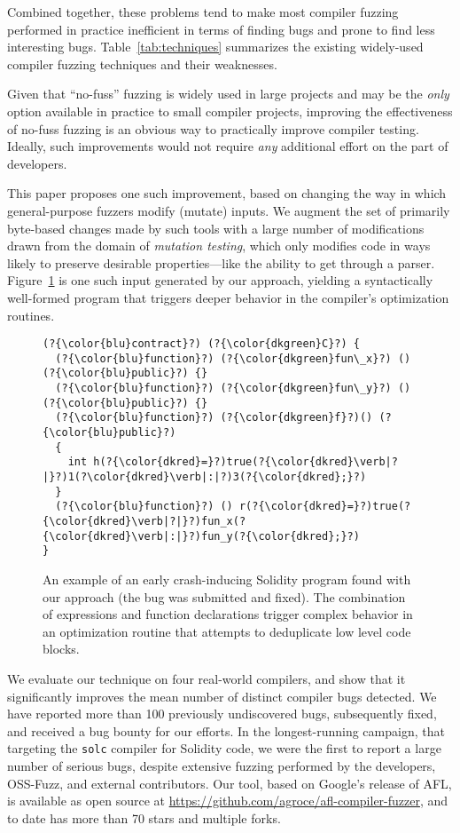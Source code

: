   Combined together, these problems tend to make most compiler fuzzing
  performed in practice inefficient in
  terms of finding bugs and prone to find less interesting bugs.
  Table~\ref{tab:techniques} summarizes the existing widely-used
  compiler fuzzing techniques and their weaknesses.

  Given that ``no-fuss'' fuzzing is widely used in large projects and
  may be the \emph{only} option available in
  practice to small compiler projects, improving the effectiveness of no-fuss fuzzing is an obvious way to practically improve compiler
  testing.  Ideally, such improvements would not require \emph{any}
  additional effort on the part of developers.

  This paper proposes one such improvement, based on changing the way
  in which general-purpose fuzzers modify (mutate) inputs.  We augment
  the set of primarily byte-based changes made by such tools with a large number of
  modifications drawn from the domain of \emph{mutation testing},
  which only modifies code in ways likely to preserve desirable
  properties---like the ability to get through a parser. Figure~\ref{lst:sol-exemplar}
  is one such input generated by our approach, yielding a syntactically well-formed program that
  triggers deeper behavior in the compiler's optimization routines.

\begin{figure}[h!]
\begin{lstlisting}[basicstyle=\scriptsize\ttfamily,numbers=none,xleftmargin=0.7em,xrightmargin=.7em]
(?{\color{blu}contract}?) (?{\color{dkgreen}C}?) {
  (?{\color{blu}function}?) (?{\color{dkgreen}fun\_x}?) () (?{\color{blu}public}?) {}
  (?{\color{blu}function}?) (?{\color{dkgreen}fun\_y}?) () (?{\color{blu}public}?) {}
  (?{\color{blu}function}?) (?{\color{dkgreen}f}?)() (?{\color{blu}public}?)
  {
    int h(?{\color{dkred}=}?)true(?{\color{dkred}\verb|?|}?)1(?\color{dkred}\verb|:|?)3(?{\color{dkred};}?)
  }
  (?{\color{blu}function}?) () r(?{\color{dkred}=}?)true(?{\color{dkred}\verb|?|}?)fun_x(?{\color{dkred}\verb|:|}?)fun_y(?{\color{dkred};}?)
}
\end{lstlisting}
\caption{An example of an early crash-inducing Solidity program found
  with our approach (the bug was submitted and fixed). The combination of expressions and function declarations trigger complex behavior in an optimization routine that attempts to deduplicate low level code blocks.}
\label{lst:sol-exemplar}
\end{figure}

  We evaluate
  our technique on four real-world compilers, and show that it
  significantly improves the mean number of distinct compiler bugs
  detected.  We have reported more than
  100 previously undiscovered 
  bugs, subsequently fixed, and received a bug bounty for
  our efforts.  In the longest-running campaign, that targeting the
  {\tt solc} compiler for Solidity code, we were the first to
  report a large number of serious bugs, despite extensive
  fuzzing  performed by the developers, OSS-Fuzz,
  and external contributors.  Our tool, based on Google's release of AFL, is available as open source at
  \url{https://github.com/agroce/afl-compiler-fuzzer}, and to date has
  more than 70 stars and multiple forks.
